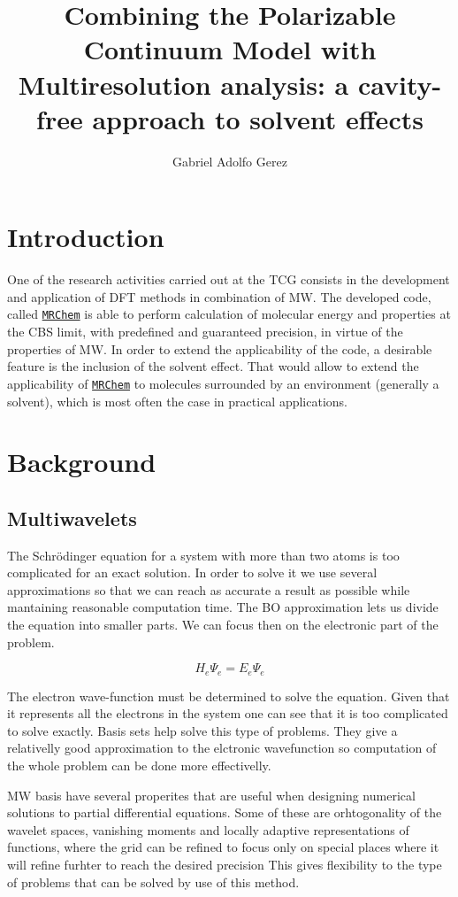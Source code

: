 \documentclass[a4paper,11pt]{article}
\title{Combining the Polarizable Continuum Model with Multiresolution
  analysis: a cavity-free approach to solvent effects}
\author{Gabriel Adolfo Gerez}
\newcommand{\mrchem}{\href{https://mrchem.readthedocs.io/en/latest/}{\texttt{MRChem}}}
\begin{document}
\maketitle

\section{Introduction}

One of the research activities carried out at the \ac{TCG} consists in
the development and application of \ac{DFT} methods in combination of
\ac{MW}. The developed code, called \mrchem{} is able to perform calculation of
molecular energy and properties at the \ac{CBS} limit, with
predefined and guaranteed precision, in virtue of the properties of
\ac{MW}. In order to extend the applicability of the code, a desirable
feature is the inclusion of the solvent effect. That would allow to
extend the applicability of \mrchem{} to molecules surrounded by an
environment (generally a solvent), which is most often the case in
practical applications.

\section{Background}

\subsection{Multiwavelets}
The Schrödinger equation for a system with more than two atoms is too
complicated for an exact solution. In order to solve it we use several
approximations so that we can reach as accurate a result as possible
while mantaining reasonable computation time.  The \ac{BO}
approximation lets us divide the equation into smaller parts. We can
focus then on the electronic part of the problem.

\begin{equation}
H_e \Psi_e = E_e \Psi_e
\end{equation}

The electron wave-function must be determined to solve the
equation. Given that it represents all the electrons in the system
one can see that it is too complicated to solve exactly. Basis sets
help solve this type of problems. They give a relativelly good
approximation to the elctronic wavefunction so computation of the
whole problem can be done more effectivelly.
 

\ac{MW} basis have several properites that are useful when designing
numerical solutions to partial differential equations. Some of these
are orhtogonality of the wavelet spaces, vanishing moments
and locally adaptive representations of functions, where the grid can
be refined to focus only on special places where it will refine
furhter to reach the desired precision \cite{Frediani:2013}
This gives flexibility to the type of problems that can be solved by use of
this method.
\end{document}
